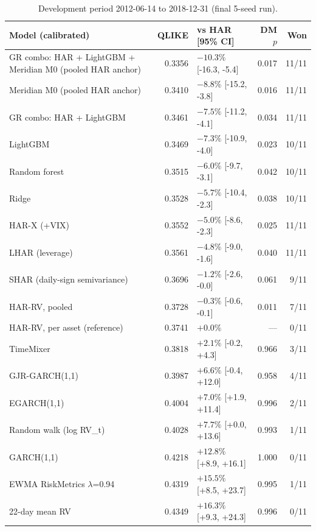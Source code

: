 \begin{table}[!htbp]
\centering
\scriptsize
\caption{Development period 2012-06-14 to 2018-12-31 (final 5-seed run).}
\label{tab:voldev}
\begin{tabularx}{\linewidth}{Xrlrr}
\toprule
\textbf{Model (calibrated)} & \textbf{QLIKE} & \textbf{vs HAR [95\% CI]} & \textbf{DM $p$} & \textbf{Won} \\
\midrule
\rowcolor{good}GR combo: HAR + LightGBM + Meridian M0 (pooled HAR anchor) & 0.3356 & $-10.3\%$ [-16.3, -5.4] & 0.017 & 11/11 \\
\rowcolor{good}Meridian M0 (pooled HAR anchor) & 0.3410 & $-8.8\%$ [-15.2, -3.8] & 0.016 & 11/11 \\
GR combo: HAR + LightGBM & 0.3461 & $-7.5\%$ [-11.2, -4.1] & 0.034 & 11/11 \\
LightGBM & 0.3469 & $-7.3\%$ [-10.9, -4.0] & 0.023 & 10/11 \\
Random forest & 0.3515 & $-6.0\%$ [-9.7, -3.1] & 0.042 & 10/11 \\
Ridge & 0.3528 & $-5.7\%$ [-10.4, -2.3] & 0.038 & 10/11 \\
HAR-X (+VIX) & 0.3552 & $-5.0\%$ [-8.6, -2.3] & 0.025 & 11/11 \\
LHAR (leverage) & 0.3561 & $-4.8\%$ [-9.0, -1.6] & 0.040 & 11/11 \\
SHAR (daily-sign semivariance) & 0.3696 & $-1.2\%$ [-2.6, -0.0] & 0.061 & 9/11 \\
HAR-RV, pooled & 0.3728 & $-0.3\%$ [-0.6, -0.1] & 0.011 & 7/11 \\
HAR-RV, per asset (reference) & 0.3741 & $+0.0\%$  & --- & 0/11 \\
TimeMixer & 0.3818 & $+2.1\%$ [-0.2, +4.3] & 0.966 & 3/11 \\
GJR-GARCH(1,1) & 0.3987 & $+6.6\%$ [-0.4, +12.0] & 0.958 & 4/11 \\
EGARCH(1,1) & 0.4004 & $+7.0\%$ [+1.9, +11.4] & 0.996 & 2/11 \\
Random walk (log RV\_t) & 0.4028 & $+7.7\%$ [+0.0, +13.6] & 0.993 & 1/11 \\
GARCH(1,1) & 0.4218 & $+12.8\%$ [+8.9, +16.1] & 1.000 & 0/11 \\
EWMA RiskMetrics $\lambda$=0.94 & 0.4319 & $+15.5\%$ [+8.5, +23.7] & 0.995 & 1/11 \\
22-day mean RV & 0.4349 & $+16.3\%$ [+9.3, +24.3] & 0.996 & 0/11 \\
\bottomrule
\end{tabularx}
\end{table}
